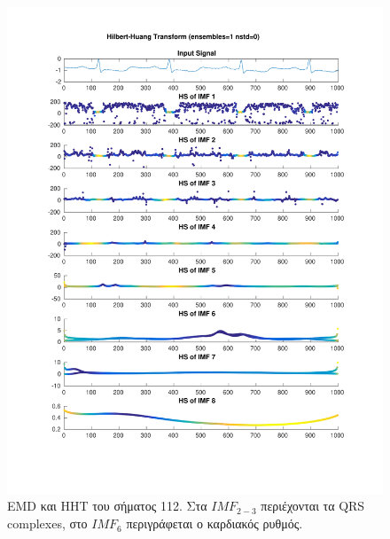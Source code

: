 \documentclass[11pt,a4paper]{article}
\begin{document}
\begin{figure}[H]
\begin{minipage}{0.48\textwidth}
	\includegraphics[width=\textwidth]{fig/112l1_hht.pdf}
\end{minipage}
\vfill
\caption{EMD και HHT του σήματος 112. Στα $IMF_{2-3}$ περιέχονται τα QRS complexes, στο $IMF_{6}$ περιγράφεται ο καρδιακός ρυθμός.}
\label{fig:112l1_hht}
\end{figure}
\end{document}
